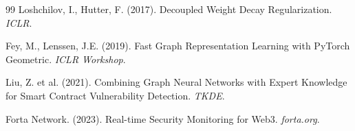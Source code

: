 \documentclass[11pt]{article}
\theoremstyle{definition}
\theoremstyle{plain}
\theoremstyle{remark}
\begin{document}
\begin{thebibliography}{99}
Loshchilov, I., Hutter, F. (2017). Decoupled Weight Decay Regularization. \textit{ICLR}.

Fey, M., Lenssen, J.E. (2019). Fast Graph Representation Learning with PyTorch Geometric. \textit{ICLR Workshop}.

Liu, Z. et al. (2021). Combining Graph Neural Networks with Expert Knowledge for Smart Contract Vulnerability Detection. \textit{TKDE}.

Forta Network. (2023). Real-time Security Monitoring for Web3. \textit{forta.org}.

\end{thebibliography}
\end{document}
